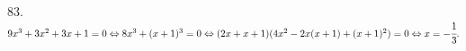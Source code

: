 83. $9x^3+3x^2+3x+1=0\Leftrightarrow 8x^3+(x+1)^3=0 \Leftrightarrow (2x+x+1)(4x^2-2x(x+1)+(x+1)^2)=0\Leftrightarrow x=-\cfrac{1}{3}.$\\
